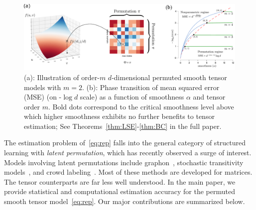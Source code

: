 \documentclass[11pt]{article}
\theoremstyle{definition}
\begin{document}
\begin{figure}[h]
    \centering
    \includegraphics[width = .75\textwidth]{figure/semantic_new.pdf}
    \caption{\small(a): Illustration of order-$m$ $d$-dimensional permuted smooth tensor models with $m=2$. (b): Phase transition of mean squared error (MSE) (on -$\log d$ scale) as a function of smoothness
$\alpha$ and tensor order $m$. Bold dots correspond to the critical smoothness level above which higher
smoothness exhibits no further benefits to tensor estimation; See Theorems~\ref{thm:LSE}-\ref{thm:BC} in the full paper.} \label{fig:rate}
   \vspace{-.2cm}
\end{figure}

The estimation problem of~\eqref{eq:rep} falls into the general category of structured learning with \emph{latent permutation}, which has recently observed a surge of interest. Models involving latent permutations include graphon~\cite{gao2015rate,klopp2017oracle}, stochastic transitivity models~\cite{shah2019low}, and crowd labeling~\cite{li2019nearest}. Most of these methods are developed for matrices. The tensor counterparts are far less well understood. 
In the main paper, we provide statistical and computational estimation accuracy for the permuted smooth tensor model~\eqref{eq:rep}.  Our major contributions are summarized below.
\end{document}
